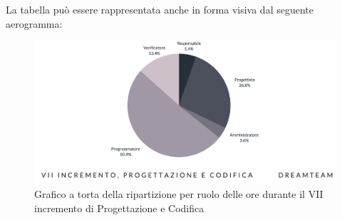 La tabella può essere rappresentata anche in forma visiva dal seguente aerogramma:
\begin{figure}[H]
\centering
\includegraphics[scale=0.50]{Sezioni/SezioniPreventivo/grafici/progettazione/Progettazione_VII_incremento_costi.png}
\caption{Grafico a torta della ripartizione per ruolo delle ore durante il VII incremento di Progettazione e Codifica}
\end{figure}

\pagebreak


